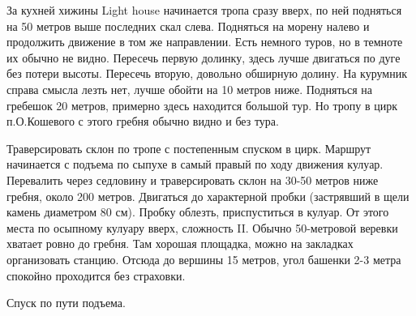 За кухней хижины Light house начинается тропа сразу вверх, по ней
подняться на 50 метров выше последних скал слева. Подняться на морену
налево и продолжить движение в том же направлении. Есть немного туров,
но в темноте их обычно не видно. Пересечь первую долинку, здесь лучше
двигаться по дуге без потери высоты. Пересечь вторую, довольно
обширную долину. На курумник справа смысла лезть нет, лучше обойти на
10 метров ниже. Подняться на гребешок 20 метров, примерно здесь
находится большой тур. Но тропу в цирк п.О.Кошевого с этого гребня
обычно видно и без тура.

Траверсировать склон по тропе с постепенным спуском в цирк. Маршрут
начинается с подъема по сыпухе в самый правый по ходу движения кулуар.
Перевалить через седловину и траверсировать склон на 30-50 метров ниже
гребня, около 200 метров. Двигаться до характерной пробки (застрявший
в щели камень диаметром 80 см). Пробку облезть, приспуститься в
кулуар. От этого места по осыпному кулуару вверх, сложность II. Обычно
50-метровой веревки хватает ровно до гребня. Там хорошая площадка,
можно на закладках организовать станцию. Отсюда до вершины 15 метров,
угол башенки 2-3 метра спокойно проходится без страховки.

Спуск по пути подъема.
